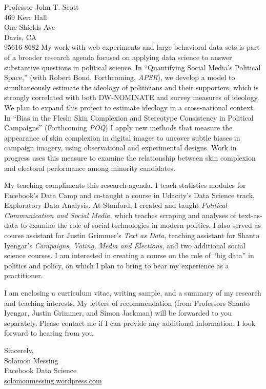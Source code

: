 \documentclass[fontsize=12pt, paper=a4]{scrlttr2}
\begin{document}
\begin{letter}{Professor John T. Scott\\
469 Kerr Hall\\
One Shields Ave\\
Davis, CA\\
95616-8682}
My work with web experiments and large behavioral data sets is part of a broader research agenda focused on applying data science to answer substantive questions in political science.  In ``Quantifying Social Media's Political Space,'' (with Robert Bond, Forthcoming, \emph{APSR}), we develop a model to simultaneously estimate the ideology of politicians and their supporters, which is strongly correlated with both DW-NOMINATE and survey measures of ideology.  We plan to expand this project to estimate ideology in a cross-national context.  In ``Bias in the Flesh: Skin Complexion and Stereotype Consistency in Political Campaigns'' (Forthcoming \emph{POQ}) I apply new methods that measure the appearance of skin complexion in digital images to uncover subtle biases in campaign imagery, using observational and experimental designs.  Work in progress uses this measure to examine the relationship between skin complexion and electoral performance among minority candidates.  

My teaching compliments this research agenda.  I teach statistics modules for Facebook's Data Camp and co-taught a course in Udacity's Data Science track, Exploratory Data Analysis.  At Stanford, I created and taught \emph{Political Communication and Social Media}, which teaches scraping and analyses of text-as-data to examine the role of social technologies in modern politics.  I also served as course assistant for Justin Grimmer's \emph{Text as Data}, teaching assistant for Shanto Iyengar's \emph{Campaigns, Voting, Media and Elections}, and two additional social science courses.  I am interested in creating a course on the role of ``big data'' in politics and policy, on which I plan to bring to bear my experience as a practitioner.  

I am enclosing a curriculum vitae, writing sample, and a summary of my research and teaching interests. My letters of recommendation (from Professors Shanto Iyengar, Justin Grimmer, and Simon Jackman) will be forwarded to you separately. Please contact me if I can provide any additional information. I look forward to hearing from you.

\closing{
Sincerely, \\
Solomon Messing\\
Facebook Data Science \\
 \url{solomonmessing.wordpress.com}
}

\end{letter}

%
%
\end{document}
